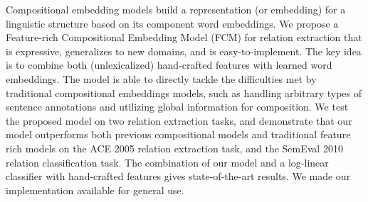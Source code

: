 Compositional embedding models build a representation (or embedding) for a linguistic structure based on its component word embeddings. We propose a Feature-rich Compositional Embedding Model (FCM) for relation extraction that is expressive, generalizes to new domains, and is easy-to-implement. The key idea is to combine both (unlexicalized) hand-crafted features with learned word embeddings. The model is able to directly tackle the difficulties met by traditional compositional embeddings models, such as handling arbitrary types of sentence annotations and utilizing global information for composition. We test the proposed model on two relation extraction tasks, and demonstrate that our model outperforms both previous compositional models and traditional feature rich models on the ACE 2005 relation extraction task, and the SemEval 2010 relation classification task. The combination of our model and a log-linear classifier with hand-crafted features gives state-of-the-art results. We made our implementation available for general use.
